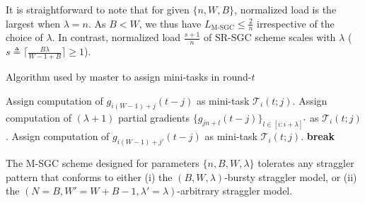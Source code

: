 \begin{remark}\normalfont\label{ch2:rem:comp_load_comparison}
    It is straightforward to note that for given $\{n,W,B\}$, normalized load is the largest when $\lambda=n$. As $B<W$, we thus have $L_\text{M-SGC}\leq \frac{2}{n}$ irrespective of the choice of $\lambda$. In contrast, normalized load $\frac{s+1}{n}$ of SR-SGC scheme scales with $\lambda$ ($s\triangleq \lceil\frac{B\lambda}{W-1+B}\rceil\geq 1$). 
\end{remark}



\begin{algorithm}
    \caption{Algorithm used by master to assign mini-tasks in round-$t$}
    \label{ch2:alg:constr_b_sgc}
    \begin{algorithmic}	
        \State Assign computation of $g_{i(W-1)+j}(t-j)$ as mini-task $\mathcal{T}_i(t;j)$.
        \EndFor
        \State Assign computation of $(\lambda+1)$ partial gradients  $\{g_{jn+l}(t-j)\}_{l\in[i:i+\lambda]^*}$  as $\mathcal{T}_i(t;j)$.
        \Else
        \State Assign computation of $g_{i(W-1)+j'}(t-j)$ as mini-task $\mathcal{T}_i(t;j)$.
        \State \textbf{break} 
        \EndIf
        \EndFor	
        \EndIf
        \EndFor
        \EndFor
    \end{algorithmic}
\end{algorithm}


\begin{prop}\label{ch2:prop:scheme_m_sgc_straggler_tolerance}
    The M-SGC scheme designed for parameters  $\{n,B,W,\lambda\}$ tolerates any straggler pattern that conforms to either (i) the $(B,W,\lambda)$-bursty straggler model, or (ii) the $(N=B, W'=W+B-1, \lambda'=\lambda)$-arbitrary straggler model.
\end{prop}

